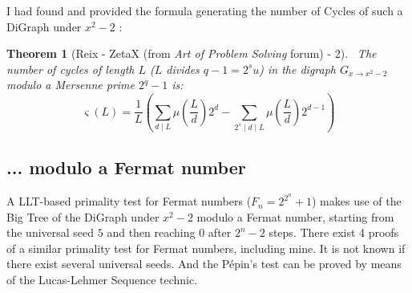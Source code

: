 \documentclass[latin1]{quadrature}
\newtheorem{theorem}{Theorem}
\newif\ifenfrancais
\begin{document}
\begin{article}
\begin{article}
\ifenfrancais
J'ai trouv\'e la formule donnant le nombre de Cycles d'un tel DiGraph sous $x^2-2$ :
\else
I had found and provided the formula generating the number of Cycles of such a DiGraph under $x^2-2$ :
\fi

\vspace{-.1in}

\ifenfrancais
\begin{theorem}[Reix - ZetaX (du forum \emph{Art of Problem Solving}) - 2]
\ 
Le nombre de Cycles de longueur $L$ (o\`u $L$ divise $q-1=2^su$) du DiGraph $G_{x \rightarrow x^2-2}$ modulo un nombre de Mersenne premier $2^q-1$
est : \vspace{-.15in}
$$\varsigma (L) = \frac{1}{L} \left( \sum_{d \mid L} \mu
\left( \frac{L}{d} \right) 2^d - \sum_{2^s \mid d \mid L} \mu \left(
\frac{L}{d} \right) 2^{d-1} \right)$$
\end{theorem}
\else
\begin{theorem}[Reix - ZetaX (from \emph{Art of Problem Solving} forum) - 2]
\ 
The number of cycles of length $L$ ($L$ divides $q-1=2^su$) in the
digraph $G_{x \rightarrow x^2-2}$ modulo a Mersenne prime $2^q-1$
is: \vspace{-.15in}
$$\varsigma (L) = \frac{1}{L} \left( \sum_{d \mid L} \mu
\left( \frac{L}{d} \right) 2^d - \sum_{2^s \mid d \mid L} \mu \left(
\frac{L}{d} \right) 2^{d-1} \right)$$
\end{theorem}
\fi


\ifenfrancais
\subsection{ ...  modulo un nombre de Fermat }
\else
\subsection{ ...  modulo a Fermat number }
\fi

\ifenfrancais
Un test de primalit\'e pour les nombres de Fermat ($F_n = 2^{2^n}+1$) bas\'e sur la m\'ethode LLT utilise l'Arbre G\'eant du DiGraph sous $x^2-2$ modulo un nombre de Fermat, commen\c{c}ant avec la graine universelle $5$ et atteignant $0$ apr\`es $2^n-2$ it\'erations. Il existe 4 preuves d'un test similaire pour les nombres de Fermat, le mien inclus. On ne sait pas s'il existe d'autres graines universelles. Il est possible de prouver le test de P\'epin au moyen de la technique \`a base d'une S\'equence de Lucas-Lehmer.
\else
A LLT-based primality test for Fermat numbers ($F_n = 2^{2^n}+1$) makes use of the Big Tree of the DiGraph under $x^2-2$ modulo a Fermat number, starting from the universal seed $5$ and then reaching $0$ after $2^n-2$ steps. There exist 4 proofs of a similar primality test for Fermat numbers, including mine. It is not known if there exist several universal seeds. And the Pépin's test can be proved by means of the Lucas-Lehmer Sequence technic.
\fi


\end{article}
\end{article}
\end{document}
